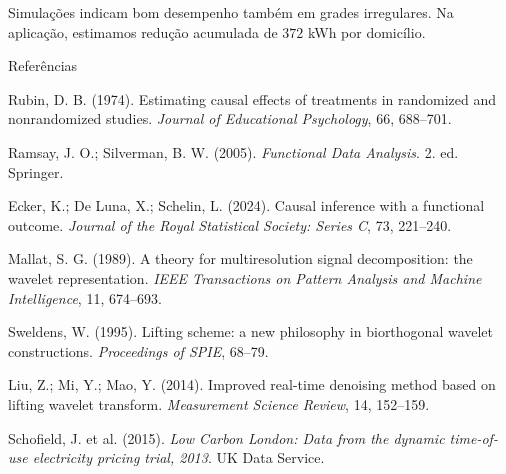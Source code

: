 \documentclass[aspectratio=169,t]{beamer}
\begin{document}
{Simulações indicam bom desempenho também em grades irregulares.}
{Na aplicação, estimamos redução acumulada de $372$ kWh por domicílio.}
\begin{frame}{Referências}
\relax
{\tamLegenda
Rubin, D. B. (1974). Estimating causal effects of treatments in randomized and nonrandomized studies. \textit{Journal of Educational Psychology}, 66, 688--701.\par\vspace{8bp}
Ramsay, J. O.; Silverman, B. W. (2005). \textit{Functional Data Analysis}. 2. ed. Springer.\par\vspace{8bp}
Ecker, K.; De Luna, X.; Schelin, L. (2024). Causal inference with a functional outcome. \textit{Journal of the Royal Statistical Society: Series C}, 73, 221--240.\par\vspace{8bp}
Mallat, S. G. (1989). A theory for multiresolution signal decomposition: the wavelet representation. \textit{IEEE Transactions on Pattern Analysis and Machine Intelligence}, 11, 674--693.\par\vspace{8bp}
Sweldens, W. (1995). Lifting scheme: a new philosophy in biorthogonal wavelet constructions. \textit{Proceedings of SPIE}, 68--79.\par\vspace{8bp}
Liu, Z.; Mi, Y.; Mao, Y. (2014). Improved real-time denoising method based on lifting wavelet transform. \textit{Measurement Science Review}, 14, 152--159.\par\vspace{8bp}
Schofield, J. et al. (2015). \textit{Low Carbon London: Data from the dynamic time-of-use electricity pricing trial, 2013}. UK Data Service.\par}
\end{frame}
\slideencerramento[\inserttitle]
\end{document}
